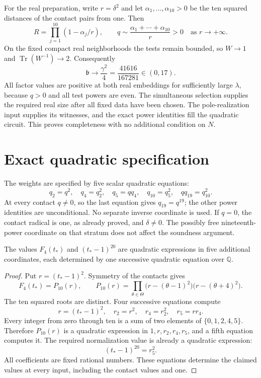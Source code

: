\documentclass[11pt,a4paper]{article}
\newcommand{\Q}{\mathbb Q}\newcommand{\Z}{\mathbb Z}\newcommand{\HH}{\mathcal H}
\DeclareMathOperator{\Tr}{Tr}\DeclareMathOperator{\Nm}{Nm}
\begin{document}
For the real preparation, write $r=\delta^2$ and let
$\alpha_1,\ldots,\alpha_{10}>0$ be the ten squared distances of the
contact pairs from one. Then
\[
 R=\prod_{j=1}^{10}(1-\alpha_j/r),\qquad
 q\sim\frac{\alpha_1+\cdots+\alpha_{10}}r>0
 \quad\text{as }r\longrightarrow+\infty.
\]
On the fixed compact real neighborhoods the tests remain bounded, so
$W\to1$ and $\Tr(W^{-1})\to2$. Consequently
\[
              \mathfrak b\longrightarrow\frac{\gamma^2}{4}
                              =\frac{41616}{167281}\in(0,17).
\]
All factor values are positive at both real embeddings for sufficiently
large $\lambda$, because $q>0$ and all test powers are even.
The simultaneous selection supplies the required real size after all
fixed data have been chosen. The pole-realization input supplies its
witnesses, and the exact power identities fill the quadratic circuit.
This proves completeness with no additional condition on $N$.

\section{Exact quadratic specification}
The weights are specified by five scalar quadratic equations:
\[
 q_2=q^2,\quad q_4=q_2^2,\quad
 q_5=qq_4,\quad q_{10}=q_5^2,\quad q q_{19}=q_{10}^2.
\]
At every contact $q\ne0$, so the last equation gives $q_{19}=q^{19}$;
the other power identities are unconditional. No separate inverse
coordinate is used. If $q=0$, the contact radical is one, as already
proved, and $\delta\ne0$. The possibly free nineteenth-power coordinate
on that stratum does not affect the soundness argument.

\begin{lemma}\label{lem:contactcircuit}
The values $F_4(t_*)$ and $(t_*-1)^{20}$ are quadratic
expressions in five additional coordinates, each determined by one
successive quadratic equation over $\Q$.
\end{lemma}
\begin{proof}
Put $r=(t_*-1)^2$. Symmetry of the contacts gives
\[
 F_4(t_*)=P_{10}(r),\qquad
 P_{10}(r)=\prod_{\theta\in\Theta}
          \bigl(r-(\theta-1)^2\bigr)\bigl(r-(\theta+4)^2\bigr).
\]
The ten squared roots are distinct. Four successive equations compute
\[
                  r=(t_*-1)^2,\quad r_2=r^2,\quad
                  r_4=r_2^2,\quad r_5=rr_4.
\]
Every integer from zero through ten is a sum of two elements of
$\{0,1,2,4,5\}$. Therefore $P_{10}(r)$ is a quadratic expression
in $1,r,r_2,r_4,r_5$, and a fifth equation computes it.
The required normalization value is already a quadratic expression:
\[
                    (t_*-1)^{20}=r_5^2.
\]
All coefficients are fixed rational numbers. These equations determine
the claimed values at every input, including the contact values and one.
\end{proof}
\end{document}
